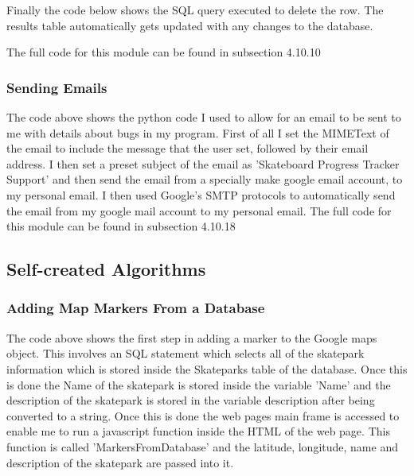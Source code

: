 \begin{landscape}
Finally the code below shows the SQL query executed to delete the row. The results table automatically gets updated with any changes to the database.


The full code for this module can be found in subsection  4.10.10




\subsubsection{Sending Emails}


The code above shows the python code I used to allow for an email to be sent to me with details about bugs in my program. First of all I set the MIMEText of the email to include the message that the user set, followed by their email address. I then set a preset subject of the email as 'Skateboard Progress Tracker Support' and then send the email from a specially make google email account, to my personal email. I then used Google's SMTP protocols to automatically send the email from my google mail account to my personal email. The full code for this module can be found in subsection 4.10.18


\subsection{Self-created Algorithms}

\subsubsection{Adding Map Markers From a Database}


The code above shows the first step in adding a marker to the Google maps object. This involves an SQL statement which selects all of the skatepark information which is stored inside the Skateparks table of the database. Once this is done the Name of the skatepark is stored inside the variable 'Name' and the description of the skatepark is stored in the variable description after being converted to a string. Once this is done the web pages main frame is accessed to enable me to run a javascript function inside the HTML of the web page. This function is called 'MarkersFromDatabase' and the latitude, longitude, name and description of the skatepark are passed into it.



\end{landscape}

